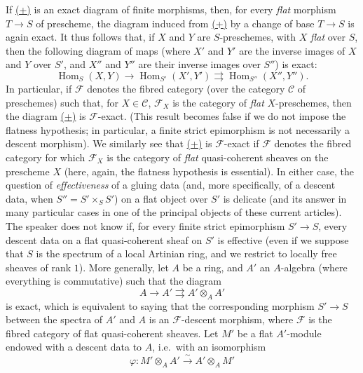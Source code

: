 \documentclass{article}
\newcommand{\oldpage}[1]{\marginpar{\footnotesize$\Big\vert$ \textit{p.~#1}}}
\theoremstyle{definition}
\theoremstyle{definition}
\theoremstyle{definition}
\theoremstyle{definition}
\theoremstyle{remark}
\begin{document}
If \protect\hyperlink{fga-3-i-section-A.2.b-equation}{(+)} is an exact diagram of finite morphisms, then, for every \emph{flat} morphism \(T\to S\) of prescheme, the diagram induced from \protect\hyperlink{fga-3-i-section-A.2.b-equation}{(+)} by a change of base \(T\to S\) is again exact.
It thus follows that, if \(X\) and \(Y\) are \(S\)-preschemes, with \(X\) \emph{flat} over \(S\), then the following diagram of maps (where \(X'\) and \(Y'\) are the inverse images of \(X\) and \(Y\) over \(S'\), and \(X''\) and \(Y''\) are their inverse images over \(S''\)) is exact:
\[
  \operatorname{Hom}_S(X,Y) \to
  \operatorname{Hom}_{S'}(X',Y') \rightrightarrows
  \operatorname{Hom}_{S''}(X'',Y'').
\]
In particular, if \({\mathcal{F}}\) denotes the fibred category (over the category \({\mathcal{C}}\) of preschemes) such that, for \(X\in{\mathcal{C}}\), \({\mathcal{F}}_X\) is the category of \emph{flat} \(X\)-preschemes, then the diagram \protect\hyperlink{fga-3-i-section-A.2.b-equation}{(+)} is \({\mathcal{F}}\)-exact.
(This result becomes false if we do not impose the flatness hypothesis; in particular, a finite strict epimorphism is not necessarily a descent morphism).
We similarly see that \protect\hyperlink{fga-3-i-section-A.2.b-equation}{(+)} is \({\mathcal{F}}\)-exact if \({\mathcal{F}}\) denotes the fibred category for which \({\mathcal{F}}_X\) is the category of \emph{flat} quasi-coherent sheaves on the prescheme \(X\) (here, again, the flatness hypothesis is essential).
\oldpage{190-09}In either case, the question of \emph{effectiveness} of a gluing data (and, more specifically, of a descent data, when \(S''=S'\times_S S'\)) on a flat object over \(S'\) is delicate (and its answer in many particular cases in one of the principal objects of these current articles).
The speaker does not know if, for every finite strict epimorphism \(S'\to S\), every descent data on a flat quasi-coherent sheaf on \(S'\) is effective (even if we suppose that \(S\) is the spectrum of a local Artinian ring, and we restrict to locally free sheaves of rank \(1\)).
More generally, let \(A\) be a ring, and \(A'\) an \(A\)-algebra (where everything is commutative) such that the diagram
\[
  A \to
  A' \rightrightarrows
  A'\otimes_A A'
\]
is exact, which is equivalent to saying that the corresponding morphism \(S'\to S\) between the spectra of \(A'\) and \(A\) is an \({\mathcal{F}}\)-descent morphism, where \({\mathcal{F}}\) is the fibred category of flat quasi-coherent sheaves.
Let \(M'\) be a flat \(A'\)-module endowed with a descent data to \(A\), i.e.~with an isomorphism
\[
  \varphi\colon M'\otimes_A A' \xrightarrow{\sim} A'\otimes_A M'
\]
\end{document}
